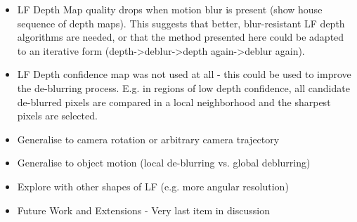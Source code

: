 \begin{itemize}

\item LF Depth Map quality drops when motion blur is present (show house sequence of depth maps). This suggests that better, blur-resistant LF depth algorithms are needed, or that the method presented here could be adapted to an iterative form (depth->deblur->depth again->deblur again).

\item LF Depth confidence map was not used at all - this could be used to improve the de-blurring process. E.g. in regions of low depth confidence, all candidate de-blurred pixels are compared in a local neighborhood and the sharpest pixels are selected.

\item Generalise to camera rotation or arbitrary camera trajectory

\item Generalise to object motion (local de-blurring vs. global deblurring)

\item Explore with other shapes of LF (e.g. more angular resolution)

\item Future Work and Extensions - Very last item in discussion

\end{itemize}




